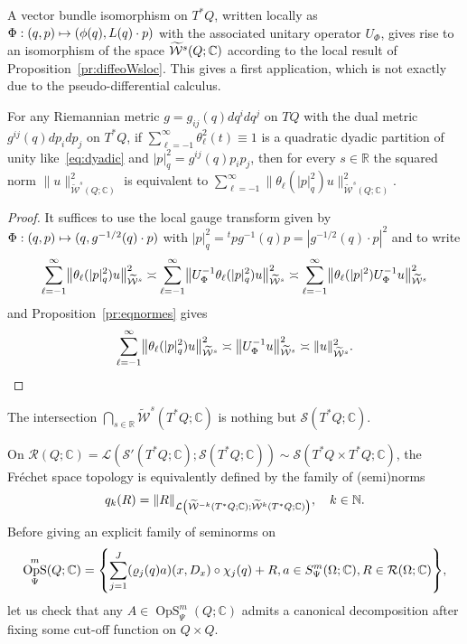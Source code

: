\documentclass[10pt]{amsart}
\theoremstyle{definition}\newtheorem{defi}[theo]{Definition}\newtheorem{rema}[theo]{Remark}\newtheorem{exam}[theo]{Example}\newtheorem{exem}[theo]{Example}\newtheorem{nota}[theo]{Notation}
\newcommand{\C}{\mathbb{C}}
\newcommand{\R}{\mathbb{R}}
\newcommand{\N}{\mathbb{N}}
\newcommand{\clW}{\mathcal{W}}
\newcommand{\clS}{\mathcal{S}}
\newcommand{\clL}{\mathcal{L}}
\newcommand{\clR}{\mathcal{R}}
\DeclareMathOperator{\OpS}{OpS}
\let\oldtilde\tilde
\renewcommand*{\tilde}[1]{\mathchoice{\widetilde{#1}}{\widetilde{#1}}{\oldtilde{#1}}{\oldtilde{#1}}}
\let\originalleft\left
\let\originalright\right
\renewcommand{\left}{\mathopen{}\mathclose\bgroup\originalleft}
\renewcommand{\right}{\aftergroup\egroup\originalright}
\let\oldmapsto\mapsto
\renewcommand*{\mapsto}{\mathchoice{\longmapsto}{\oldmapsto}{\oldmapsto}{\oldmapsto}}
\begin{document}
A vector bundle isomorphism on $T^{*}Q$, written locally as $\Phi:(q,p)\mapsto (\phi(q),\linebreak L(q)\cdot p)$ with the associated unitary operator $U_{\Phi}$, gives rise to an isomorphism of the space $\tilde{\clW}^{s}(Q;\C)$ according to the local result of Proposition~\ref{pr:diffeoWsloc}. This gives a first application, which is not exactly due to the pseudo-differential calculus.
\begin{prop}\label{pr:dyadic}
For any Riemannian metric $g=g_{ij}(q)dq^{i}dq^{j}$ on $TQ$ with the dual metric $g^{ij}(q)dp_{i}dp_{j}$ on $T^{*}Q$, if $\sum_{\ell=-1}^{\infty}\theta_{\ell}^{2}(t)\equiv 1$ is a quadratic dyadic partition of unity like~\eqref{eq:dyadic} and $|p|_{q}^{2}=g^{ij}(q)p_{i}p_{j}$, then for every $s\in \R$ the squared norm $\|u\|^{2}_{\widetilde{\clW}^{s}(Q;\C)}$ is equivalent to $\sum_{\ell=-1}^{\infty}\|\theta_{\ell}(|p|_{q}^{2})u\|^{2}_{\widetilde{\clW}^{s}(Q;\C)}$.
\end{prop}
\begin{proof}
It suffices to use the local gauge transform given by $\Phi:(q,p)\mapsto (q,g^{-1/2}(q)\cdot p)$ with $|p|_{q}^{2}={}^{t}p g^{-1}(q)p=|g^{-1/2}(q)\cdot p|^{2}$ and to write
\[
\sum_{\ell=-1}^{\infty}\left\|\theta_{\ell}(|p|_{q}^{2})u\right\|^{2}_{\widetilde{\clW}^{s}}\asymp\sum_{\ell=-1}^{\infty}
\left\|U_{\Phi}^{-1}\theta_{\ell}(|p|_{q}^{2})u\right\|^{2}_{\widetilde{\clW}^{s}}
\asymp\sum_{\ell=-1}^{\infty}\left\|\theta_{\ell}(|p|^{2})U_{\Phi}^{-1}u\right\|^{2}_{\widetilde{\clW}^{s}}
\]
and Proposition~\ref{pr:eqnormes} gives
\[
\sum_{\ell=-1}^{\infty}\left\|\theta_{\ell}(|p|_{q}^{2})u\right\|^{2}_{\widetilde{\clW}^{s}}\asymp \left\|U_{\Phi}^{-1}u\right\|^{2}_{\widetilde{\clW}^{s}}\asymp \|u\|^{2}_{\widetilde{\clW}^{s}}.\qedhere
\]
\end{proof}

The intersection $\bigcap_{s\in \R}\widetilde{\clW}^{s}(T^{*}Q;\C)$ is nothing but $\clS(T^{*}Q;\C)$.

On $\clR(Q;\C)=\clL(\clS'(T^{*}Q;\C);\clS(T^{*}Q;\C))\sim \clS(T^{*}Q\times T^{*}Q;\C)$, the Fréchet space topology is equivalently defined by the family of (semi)norms
\[
q_{k}(R)=\|R\|_{\clL\left(\widetilde{\clW}^{-k}(T^{*}Q;\C);\widetilde{\clW}^{k}(T^{*}Q;\C)\right)},\quad k\in\N.
\]
Before giving an explicit family of seminorms on
\[
\OpS^{m}_{\Psi}(Q;\C)=\left\{\sum_{j=1}^{J}(\varrho_{j}(q)a)(x,D_{x})\circ\chi_{j}(q)+ R, a\in S^{m}_{\Psi}(\Omega;\C), R\in \clR(\Omega;\C)\right\},
\]
let us check that any $A\in \OpS^{m}_{\Psi}(Q;\C)$ admits a canonical decomposition after fixing some cut-off function on $Q\times Q$.
\end{document}
